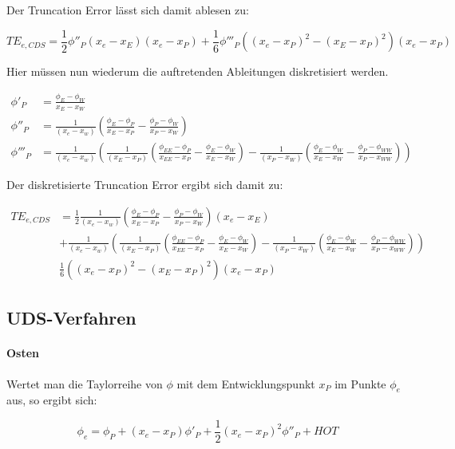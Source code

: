 \documentclass[11pt, ngerman,colorback,accentcolor=tud2d]{tudreport}
\begin{document}
Der Truncation Error lässt sich damit ablesen zu:

\begin{equation*}
  TE_{e, CDS} =  \frac{1}{2} \phi''_P (x_e-x_E)(x_e-x_P)+ \frac{1}{6} \phi'''_P \left({(x_e-x_P)^2-(x_E-x_P)^2}\right)(x_e-x_P)
\end{equation*}


Hier müssen nun wiederum die auftretenden Ableitungen diskretisiert werden.

\begin{align}
  \phi'_P &= \frac{\phi_E-\phi_W}{x_E-x_W}\\
  \phi''_P &= \frac{1}{(x_e-x_w)} \left({\frac{\phi_E-\phi_P}{x_E-x_P}
  - \frac{\phi_P-\phi_W}{x_P-x_W} }\right)\\
  \phi'''_P &= \frac{1}{(x_e-x_w)} \left({
  \frac{1}{(x_E-x_P)} \left({\frac{\phi_{EE}-\phi_P}{x_{EE}-x_P}- \frac{\phi_E-\phi_W}{x_E-x_W} }\right)-
  \frac{1}{(x_P-x_W)} \left({\frac{\phi_E-\phi_W}{x_E-x_W} - \frac{\phi_P-\phi_{WW}}{x_P-x_{WW}} }\right)
  }\right)
\end{align}

Der diskretisierte Truncation Error ergibt sich damit zu:

\begin{align}
  TE_{e, CDS} &=  \frac{1}{2} \frac{1}{(x_e-x_w)} \left({\frac{\phi_E-\phi_P}{x_E-x_P}
  - \frac{\phi_P-\phi_W}{x_P-x_W} }\right) (x_e-x_E) \nonumber \\
  &+
 \frac{1}{(x_e-x_w)} \left({
  \frac{1}{(x_E-x_P)} \left({\frac{\phi_{EE}-\phi_P}{x_{EE}-x_P}- \frac{\phi_E-\phi_W}{x_E-x_W} }\right)-
  \frac{1}{(x_P-x_W)} \left({\frac{\phi_E-\phi_W}{x_E-x_W} - \frac{\phi_P-\phi_{WW}}{x_P-x_{WW}} }\right)
  }\right) \nonumber \\
  &\frac{1}{6} \left({(x_e-x_P)^2-(x_E-x_P)^2}\right)(x_e-x_P)
\end{align}




\subsection{UDS-Verfahren}

\paragraph{Osten}

Wertet man die Taylorreihe von $\phi$ mit dem Entwicklungspunkt $x_P$ im Punkte $\phi_e$
aus, so ergibt sich:

\begin{equation*}
  \phi_e = \phi_P +(x_e-x_P) \phi'_P + \frac{1}{2} (x_e-x_P)^2 \phi''_P+HOT
\end{equation*}
\end{document}
